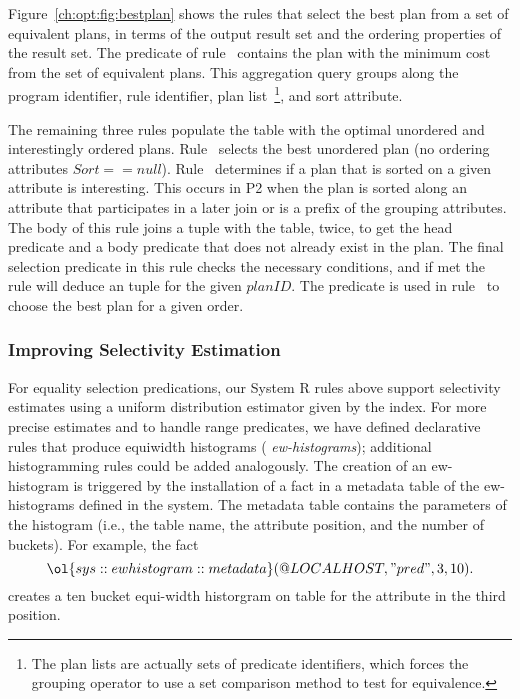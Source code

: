 Figure~\ref{ch:opt:fig:bestplan} shows the rules that select the best plan
from a set of equivalent plans, in terms of the output result set and the
ordering properties of the result set.  The  predicate of
rule~ contains the plan with the minimum cost from the set of
equivalent plans.  This aggregation query groups along the program identifier,
rule identifier, plan list~\footnote{The plan lists are actually sets of
predicate identifiers, which forces the grouping operator to use a set
comparison method to test for equivalence.}, and sort attribute.  

The remaining three rules populate the  table with the optimal
unordered and interestingly ordered plans.  Rule~ selects the best
unordered plan (no ordering attributes $Sort == null$).  Rule~
determines if a plan that is sorted on a given attribute is interesting.  This
occurs in P2 when the plan is sorted along an attribute that participates in a
later join or is a prefix of the grouping attributes.  The body of this rule
joins a  tuple with the  table, twice, to get the head
predicate and a body predicate that does not already exist in the plan.  The
final selection predicate in this rule checks the necessary conditions, and if
met the rule will deduce an  tuple for the given $planID$.
The  predicate is used in rule~ to choose the best
plan for a given order.

\subsubsection{Improving Selectivity Estimation}

For equality selection predications, our System R rules above support
selectivity estimates using a uniform distribution estimator given by the
index.  For more precise estimates and to handle range predicates, we have
defined declarative rules that produce equiwidth histograms ({\em
ew-histograms}); additional histogramming rules could be added analogously.
The creation of an ew-histogram is triggered by the installation of a fact in a
metadata table of the ew-histograms defined in the system.  The metadata table
contains the parameters of the histogram (i.e., the table name, the attribute
position, and the number of buckets).  For example, the fact \[
\ol{sys::ewhistogram::metadata}(@LOCALHOST, "pred", 3, 10).  \] creates a ten
bucket equi-width historgram on table  for the attribute in the third
position.

